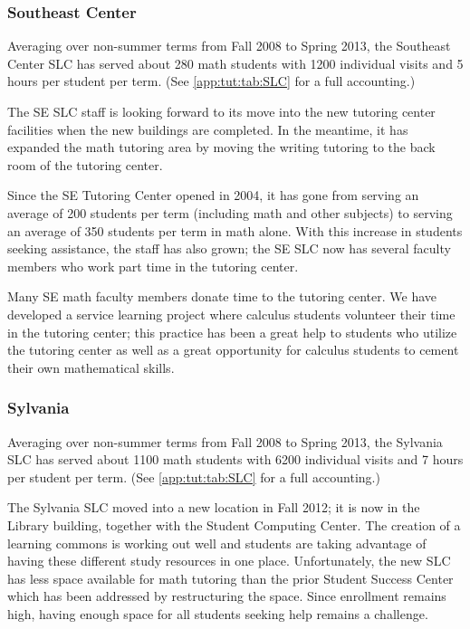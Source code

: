 \subsubsection{Southeast Center}
Averaging over non-summer terms from Fall 2008 to Spring 2013, the Southeast Center SLC has served about 
280 math students with 1200 individual visits and 5 hours per student per term. (See \vref{app:tut:tab:SLC} for a full accounting.) 

The SE SLC staff is looking forward to its move into the new tutoring center
facilities when the new buildings are completed. In the meantime, it has
expanded the math tutoring area by moving the writing tutoring to the back room
of the tutoring center.  

Since the SE Tutoring Center opened in 2004, it has gone from serving an
average of 200 students per term (including math and other subjects) to serving an average of 350 students per term in math alone.  With this increase in students
seeking assistance, the staff has also grown; the SE SLC now has several faculty
members who work part time in the tutoring center. 

Many SE math faculty members donate time to the tutoring center. We have
developed a service learning project where calculus students volunteer their
time in the tutoring center; this practice has been a great help to
students who utilize the tutoring center as well as a great opportunity for
calculus students to cement their own mathematical skills.

\subsubsection{Sylvania}
Averaging over non-summer terms from Fall 2008 to Spring 2013, the Sylvania SLC has served about 
1100 math students with 6200 individual visits and 7 hours per student per term. (See \vref{app:tut:tab:SLC} for a full accounting.) 

The Sylvania SLC moved into a new location in Fall 2012; it is now in
the Library building, together with the Student Computing Center. The creation
of a learning commons is working out well and students are taking advantage of
having these different study resources in one place. Unfortunately, the new SLC
has less space available for math tutoring than the prior Student Success Center
which has been addressed by restructuring the space. Since enrollment remains high, having enough space
for all students seeking help remains a challenge.

